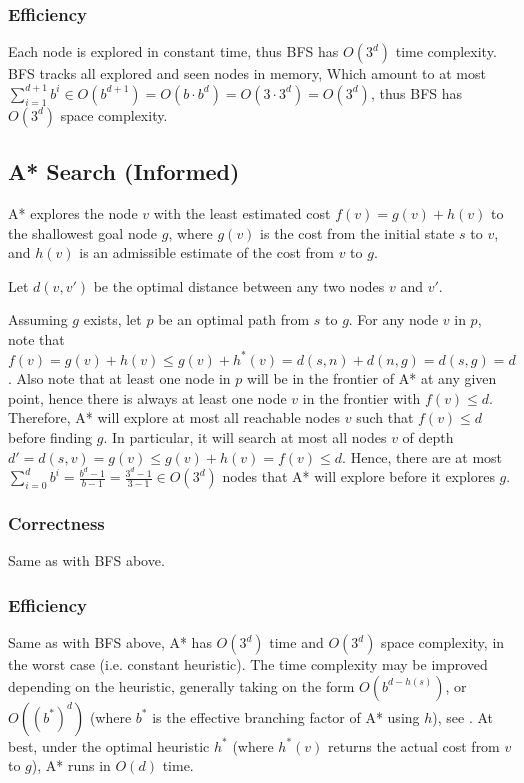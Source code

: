 \documentclass[runningheads]{llncs}
\begin{document}
\subsubsection{Efficiency}
Each node is explored in constant time, thus BFS has $O(3^d)$ time complexity. BFS tracks all explored and seen nodes in memory, Which amount to at most $\sum_{i=1}^{d+1} b^i \in O(b^{d+1}) = O(b \cdot b^d) = O(3 \cdot 3^d) = O(3^d)$, thus BFS has $O(3^d)$ space complexity.

\subsection{A* Search (Informed)}

A* explores the node $v$ with the least estimated cost $f(v) = g(v) + h(v)$ to the shallowest goal node $g$, where $g(v)$ is the cost from the initial state $s$ to $v$, and $h(v)$ is an admissible estimate of the cost from $v$ to $g$.

Let $d(v,v')$ be the optimal distance between any two nodes $v$ and $v'$.

Assuming $g$ exists, let $p$ be an optimal path from $s$ to $g$. For any node $v$ in $p$, note that $f(v) = g(v) + h(v) \leq g(v) + h^\ast(v) = d(s,n)+d(n,g) = d(s,g) = d$. Also note that at least one node in $p$ will be in the frontier of A* at any given point, hence there is always at least one node $v$ in the frontier with $f(v) \leq d$. Therefore, A* will explore at most all reachable nodes $v$ such that $f(v) \leq d$ before finding $g$. In particular, it will search at most all nodes $v$ of depth $d' = d(s,v) = g(v) \leq g(v)+h(v) = f(v) \leq d$. Hence, there are at most $\sum_{i=0}^d b^i = \frac{b^d-1}{b-1} = \frac{3^d-1}{3-1} \in O(3^d)$ nodes that A* will explore before it explores $g$.

\subsubsection{Correctness}
Same as with BFS above.

\subsubsection{Efficiency}
Same as with BFS above, A* has $O(3^d)$ time and $O(3^d)$ space complexity, in the worst case (i.e. constant heuristic). The time complexity may be improved depending on the heuristic, generally taking on the form $O(b^{d-h(s)})$, or $O((b^\ast)^d)$ (where $b^\ast$ is the effective branching factor of A* using $h$), see \cite{AIMA-A*Complexity}. At best, under the optimal heuristic $h^\ast$ (where $h^\ast(v)$ returns the actual cost from $v$ to $g$), A* runs in $O(d)$ time.
\end{document}
